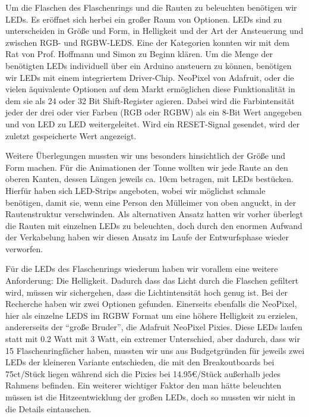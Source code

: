         Um die Flaschen des Flaschenrings und die Rauten zu beleuchten benötigen wir LEDs. Es eröffnet sich herbei ein großer Raum von Optionen. LEDs sind zu unterscheiden in Größe und Form, in Helligkeit und der Art der Ansteuerung und zwischen RGB- und RGBW-LEDS.
        Eine der Kategorien konnten wir mit dem Rat von Prof. Hoffmann und Simon zu Beginn klären. Um die Menge der benötigten LEDs individuell über ein Arduino ansteuern zu können, benötigen wir LEDs mit einem integriertem Driver-Chip. NeoPixel von Adafruit, oder die vielen äquivalente Optionen auf dem Markt ermöglichen diese Funktionalität in dem sie als 24 oder 32 Bit Shift-Register agieren. Dabei wird die Farbintensität jeder der drei oder vier Farben (RGB oder RGBW) als ein 8-Bit Wert angegeben und von LED zu LED weitergeleitet.
        Wird ein RESET-Signal gesendet, wird der zuletzt gespeicherte Wert angezeigt.

        Weitere Überlegungen mussten wir uns besonders hinsichtlich der Größe und Form machen. Für die Animationen der Tonne wollten wir jede Raute an den oberen Kanten, dessen Längen jeweils ca. 10cm betragen, mit LEDs bestücken. Hierfür haben sich LED-Strips angeboten, wobei wir möglichst schmale benötigen, damit sie, wenn eine Person den Mülleimer von oben anguckt, in der Rautenstruktur verschwinden. Als alternativen Ansatz hatten wir vorher überlegt die Rauten mit einzelnen LEDs zu beleuchten, doch durch den enormen Aufwand der Verkabelung haben wir diesen Ansatz im Laufe der Entwurfsphase wieder verworfen.

        Für die LEDs des Flaschenrings wiederum haben wir vorallem eine weitere Anforderung: Die Helligkeit. Dadurch dass das Licht durch die Flaschen gefiltert wird, müssen wir sichergehen, dass die Lichtintensität hoch genug ist. Bei der Recherche haben wir zwei Optionen gefunden.
        Einerseits ebenfalls die NeoPixel, hier als einzelne LEDS im RGBW Format um eine höhere Helligkeit zu erzielen, andererseits der \enquote{große Bruder}, die Adafruit NeoPixel Pixies. Diese LEDs laufen statt mit 0.2 Watt mit 3 Watt, ein extremer Unterschied, aber dadurch, dass wir 15 Flaschenringfächer haben, mussten wir uns aus Budgetgründen für jeweils zwei LEDs der kleineren Variante entschieden, die mit den Breakoutboards bei 75ct/Stück liegen während sich die Pixies bei 14.95€/Stück außerhalb jedes Rahmens befinden. Ein weiterer wichtiger Faktor den man hätte beleuchten müssen ist die Hitzeentwicklung der großen LEDs, doch so mussten wir nicht in die Details eintauschen.


